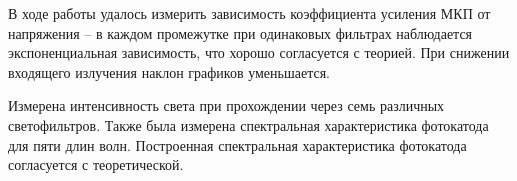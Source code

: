 \documentclass[12pt, a4paper]{article}
\begin{document}

В ходе работы удалось измерить зависимость коэффициента усиления МКП от напряжения -- в каждом промежутке при одинаковых фильтрах наблюдается экспоненциальная
зависимость, что хорошо согласуется с теорией. При снижении входящего излучения наклон графиков уменьшается.

Измерена интенсивность света при прохождении через семь различных светофильтров. Также была
измерена спектральная характеристика фотокатода для пяти длин волн. Построенная спектральная характеристика фотокатода согласуется с теоретической.

\end{document}
